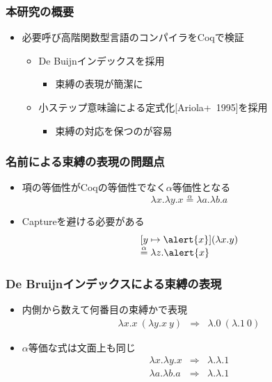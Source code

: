 \documentclass[dvipdfmx,cjk,xcolor=dvipsnames,envcountsect,notheorems,12pt]{beamer}
\theoremstyle{definition}
\begin{document}
\begin{frame}
	\frametitle{本研究の概要}
	\begin{itemize}
		\item 必要呼び高階関数型言語のコンパイラをCoqで検証
			\begin{itemize}
				\item De Buijnインデックスを採用
					\begin{itemize}
						\item 束縛の表現が簡潔に
					\end{itemize}
				\item 小ステップ意味論による定式化\mbox{[Ariola+ 1995]}を採用
					\begin{itemize}
						\item 束縛の対応を保つのが容易
					\end{itemize}
			\end{itemize}
	\end{itemize}
\end{frame}

\begin{frame}
	\frametitle{名前による束縛の表現の問題点}
	\begin{itemize}
		\item 項の等価性がCoqの等価性でなく\mbox{$\alpha$等価性}となる
			\[ \lambda x.\lambda y.x \overset{\alpha}{=} \lambda a.\lambda b.a \]
		\item Captureを避ける必要がある
			\only<1>{\[\begin{array}{l}
				[y \mapsto \alert{x}](\lambda x.y) \\
				\overset{\alpha}{\cancel{=}}~\lambda \alert{x}.\alert{x}
			\end{array}\]}
			\pause
			\[\begin{array}{l}
				[y \mapsto \alert{x}](\lambda x.y) \\
				\overset{\alpha}{=} \lambda z.\alert{x}
			\end{array}\]
	\end{itemize}
\end{frame}

\begin{frame}
	\frametitle{De Bruijnインデックスによる束縛の表現}
	\begin{itemize}
		\item 内側から数えて何番目の束縛かで表現
			{\LARGE \[\begin{array}{lcl}
				\lambda x.x~(\lambda y.x~y) & \Rightarrow & \lambda.0~(\lambda.1~0)
			\end{array}\]}
		\item $\alpha$等価な式は文面上も同じ
			{\LARGE \[\begin{array}{lcl}
				\lambda x.\lambda y.x & \Rightarrow & \lambda.\lambda.1 \\
				\lambda a.\lambda b.a & \Rightarrow & \lambda.\lambda.1 \\
			\end{array}\]}
	\end{itemize}
\end{frame}
\end{document}
